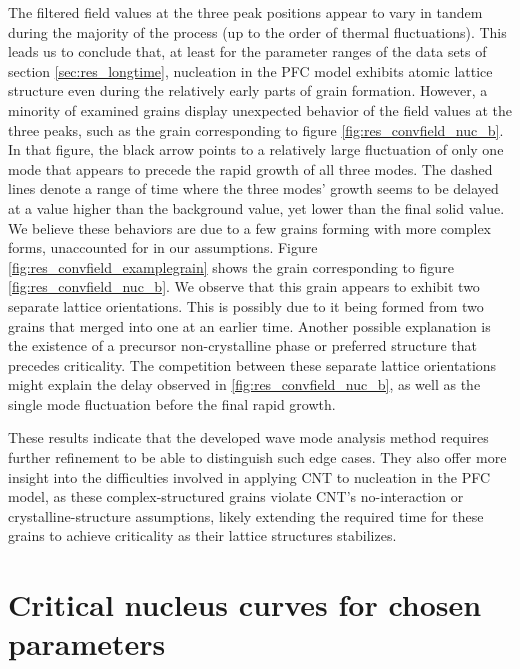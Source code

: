The filtered field values at the three peak positions appear to vary in tandem during the majority of the process (up to the order of thermal fluctuations). This leads us to conclude that, at least for the parameter ranges of the data sets of section \ref{sec:res_longtime}, nucleation in the PFC model exhibits atomic lattice structure even during the relatively early parts of grain formation. However, a minority of examined grains display unexpected behavior of the field values at the three peaks, such as the grain corresponding to figure \ref{fig:res_convfield_nuc_b}. In that figure, the black arrow points to a relatively large fluctuation of only one mode that appears to precede the rapid growth of all three modes. The dashed lines denote a range of time where the three modes' growth seems to be delayed at a value higher than the background value, yet lower than the final solid value. We believe these behaviors are due to a few grains forming with more complex forms, unaccounted for in our assumptions. Figure \ref{fig:res_convfield_examplegrain} shows the grain corresponding to figure \ref{fig:res_convfield_nuc_b}. We observe that this grain appears to exhibit two separate lattice orientations. This is possibly due to it being formed from two grains that merged into one at an earlier time. Another possible explanation is the existence of a precursor non-crystalline phase or preferred structure that precedes criticality. The competition between these separate lattice orientations might explain the delay observed in \ref{fig:res_convfield_nuc_b}, as well as the single mode fluctuation before the final rapid growth.

These results indicate that the developed wave mode analysis method requires further refinement to be able to distinguish such edge cases. They also offer more insight into the difficulties involved in applying CNT to nucleation in the PFC model, as these complex-structured grains violate CNT's no-interaction or crystalline-structure assumptions, likely extending the required time for these grains to achieve criticality as their lattice structures stabilizes.






\section{Critical nucleus curves for chosen parameters}\label{sec:res_testnuc}

